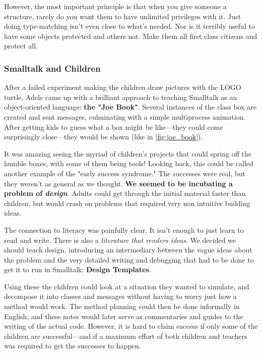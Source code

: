 \documentclass[letterpaper,12pt,parskip=full]{article}
\begin{document}
However, the most important principle is that when you give someone a structure, rarely do you want them to have unlimited privileges with it. Just doing type-matching isn't even close to what's needed. Nor is it terribly useful to have some objects protected and others not. Make them all first class citizens and protect all. 

\subsubsection{Smalltalk and Children}

After a failed experiment making the children draw pictures with the LOGO turtle, Adele came up with a brilliant approach to teaching Smalltalk as an object-oriented language: \textbf{the "Joe Book"}. Several instances of the class box are created and sent messages, culminating with a simple multiprocess animation. After getting kids to guess what a box might be like—they could come surprisingly close—they would be shown (like in \ref{fig:joe_book}).

It was amazing seeing the myriad of children's projects that could spring off the humble boxes, with some of them being tools! Looking back, this could be called another example of the "early success syndrome." The successes were real, but they weren't as general as we thought. \textbf{We seemed to be incubating a problem of \textit{design}}. Adults could get through the initial material faster than children, but would crash on problems that required very non intuitive building ideas.

The connection to literacy was painfully clear. It isn't enough to just learn to read and write. There is also a \textit{literature that renders ideas}. We decided we should teach design, introducing an intermediary between the vague ideas about the problem and the very detailed writing and debugging that had to be done to get it to run in Smalltalk: \textbf{Design Templates}.

Using these the children could look at a situation they wanted to simulate, and decompose it into classes and messages without having to worry just how a method would work. The method planning could then be done informally in English, and these notes would later serve as commentaries and guides to the writing of the actual code. However, it is hard to claim success if only some of the children are successful—and if a maximum effort of both children and teachers was required to get the successes to happen.
\end{document}
